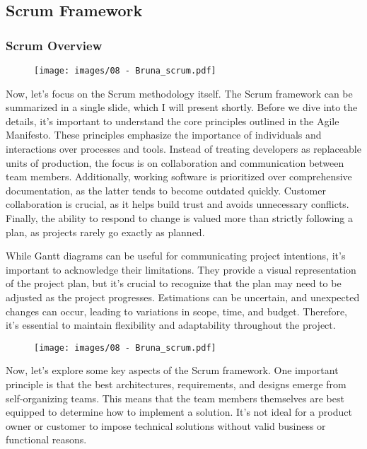 \subsection{Scrum Framework}

\subsubsection{Scrum Overview}

\begin{figure}[!h]
  \centering
  \texttt{[image: images/08 - Bruna\_scrum.pdf]}
\end{figure}

Now, let's focus on the Scrum methodology itself. The Scrum framework
can be summarized in a single slide, which I will present shortly.
Before we dive into the details, it's important to understand the core
principles outlined in the Agile Manifesto. These principles emphasize
the importance of individuals and interactions over processes and tools.
Instead of treating developers as replaceable units of production, the
focus is on collaboration and communication between team members.
Additionally, working software is prioritized over comprehensive
documentation, as the latter tends to become outdated quickly. Customer
collaboration is crucial, as it helps build trust and avoids unnecessary
conflicts. Finally, the ability to respond to change is valued more than
strictly following a plan, as projects rarely go exactly as planned.

While Gantt diagrams can be useful for communicating project intentions,
it's important to acknowledge their limitations. They provide a visual
representation of the project plan, but it's crucial to recognize that
the plan may need to be adjusted as the project progresses. Estimations
can be uncertain, and unexpected changes can occur, leading to
variations in scope, time, and budget. Therefore, it's essential to
maintain flexibility and adaptability throughout the project.

\begin{figure}[!h]
  \centering
  \texttt{[image: images/08 - Bruna\_scrum.pdf]}
\end{figure}

Now, let's explore some key aspects of the Scrum framework. One
important principle is that the best architectures, requirements, and
designs emerge from self-organizing teams. This means that the team
members themselves are best equipped to determine how to implement a
solution. It's not ideal for a product owner or customer to impose
technical solutions without valid business or functional reasons.

